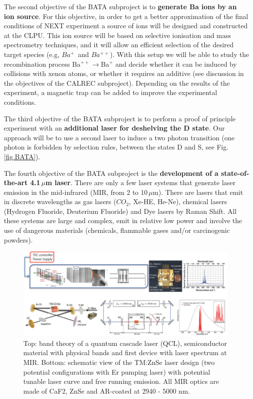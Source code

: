 The second objective of the BATA subproject is to {\bf generate Ba ions by an ion source}. For this objective, in order to get a better approximation of the final conditions of NEXT experiment a source of ions will be designed and constructed at the CLPU. This ion source will be based on selective ionisation and mass spectrometry techniques, and it will allow an efficient selection of the desired target species (e.g, $Ba^{+}$~and $Ba^{++}$). With this setup we will be able to study the recombination process Ba$^{++}\rightarrow$Ba$^{+}$ and decide whether it can be induced by collisions with xenon atoms, or whether it requires an additive (see discussion in the objectives of the CALREC subproject). Depending on the results of the experiment, a magnetic trap can be added to improve the experimental conditions. 

The third objective of the BATA subproject is to perform a proof of principle experiment with an {\bf additional laser for deshelving the D state}. Our approach will be to use a second laser to induce a two photon transition (one photon is forbidden by selection rules, between the states D and S, see Fig.\,\ref{fig.BATA}). 	

The fourth objective of the BATA subproject is the {\bf development of a state-of-the-art 4.1\,$\mu$m laser}. There are only a few laser systems that generate laser emission in the mid-infrared (MIR, from 2 to 10\,$\mu$m). There are lasers that emit in discrete wavelengths as gas lasers ($CO_2$, Xe-HE, He-Ne), chemical lasers (Hydrogen Fluoride, Deuterium Fluoride) and Dye lasers by Raman Shift. All these systems are large and complex, emit in relative low power and involve the use of dangerous materials (chemicals, flammable gases and/or carcinogenic powders). 

\begin{figure}[h!]
\begin{center}
\includegraphics[width=0.99\textwidth]{img/MIR.png}
\end{center}
\caption{\label{Fig:MIR}\small Top: band theory of a quantum cascade laser (QCL), semiconductor material with physical bands and first device with laser spectrum at MIR. Bottom: schematic view of the TM:ZnSe laser design (two potential configurations with Er pumping laser) with potential tunable laser curve and free running emission. All MIR optics are made of CaF2, ZnSe and AR-coated at 2940 - 5000 nm.}
\end{figure}

